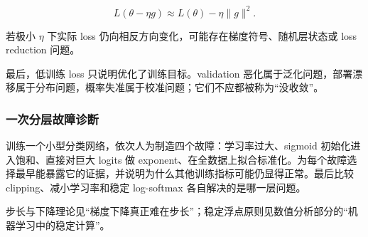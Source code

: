\[
L(\theta-\eta g)
\approx L(\theta)-\eta\|g\|^2.
\]

若极小 \(\eta\) 下实际 loss 仍向相反方向变化，可能存在梯度符号、随机层状态或 loss reduction 问题。

最后，低训练 loss 只说明优化了训练目标。validation 恶化属于泛化问题，部署漂移属于分布问题，概率失准属于校准问题；它们不应都被称为``没收敛''。

\subsubsection{一次分层故障诊断}

训练一个小型分类网络，依次人为制造四个故障：学习率过大、sigmoid 初始化进入饱和、直接对巨大 logits 做 exponent、在全数据上拟合标准化。为每个故障选择最早能暴露它的证据，并说明为什么其他训练指标可能仍显得正常。最后比较 clipping、减小学习率和稳定 log-softmax 各自解决的是哪一层问题。

步长与下降理论见``梯度下降真正难在步长''；稳定浮点原则见数值分析部分的``机器学习中的稳定计算''。
